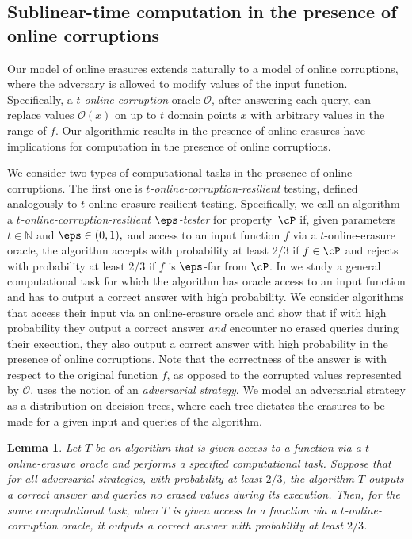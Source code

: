 \documentclass[11pt]{article}
\numberwithin{equation}{section}
\newtheorem{lemma}[theorem]{Lemma}
\theoremstyle{definition}
\theoremstyle{plain}
\begin{document}
%
\subsection{Sublinear-time computation in the presence of online corruptions}

Our model of online erasures extends naturally to a model of online corruptions, where the adversary is allowed to modify values of the input function. Specifically, a \emph{$t$-online-corruption} oracle $\mathcal{O}$, after answering each query, can replace values $\mathcal{O}(x)$ on up to $t$ domain points $x$ with arbitrary values in the range of $f$. Our algorithmic results in the presence of online erasures have implications for computation in the presence of online corruptions. 

We consider two types of computational tasks in the presence of online corruptions. The first one is {\em $t$-online-corruption-resilient} testing, defined analogously to $t$-online-erasure-resilient testing. Specifically, we call an algorithm a {\em $t$-online-corruption-resilient $\eps$-tester} for property~$\cP$ if, given parameters $t\in\mathbb{N}$ and $\eps\in(0,1),$ and access to an input function $f$ via a $t$-online-erasure oracle, the algorithm accepts with probability at least 2/3 if $f\in\cP$ and rejects with probability at least 2/3 if $f$ is $\eps$-far from $\cP$.
In  we study a general computational task for which the algorithm has oracle access to an input function and has to output a correct answer with high probability. We consider algorithms that access their input via an online-erasure oracle and show that if with high probability they output a correct answer \emph{and} encounter no erased queries during their execution, they also output a correct answer with high probability in the presence of online corruptions. Note that the correctness of the answer is with respect to the original function $f$, as opposed to the corrupted values represented by $\mathcal{O}$.
%
%
%
%
%
%
%
%
  uses the notion of an \emph{adversarial strategy}.
We model an adversarial strategy as a distribution on decision trees, where each tree dictates the erasures to be made for a given input and queries of the algorithm.

%
%
%
%


\begin{lemma}\label{lem:no_erasures}
    Let $T$ be an algorithm that is given access to a function via a $t$-online-erasure oracle and performs a specified computational task. Suppose that for all adversarial strategies, with probability at least $2/3$, the algorithm $T$ outputs a correct answer and queries no erased values during its execution. Then, for the same computational task, when $T$ is given access to a function via a $t$-online-corruption oracle, it outputs a correct answer with probability at least $2/3$. 
\end{lemma}
\end{document}
